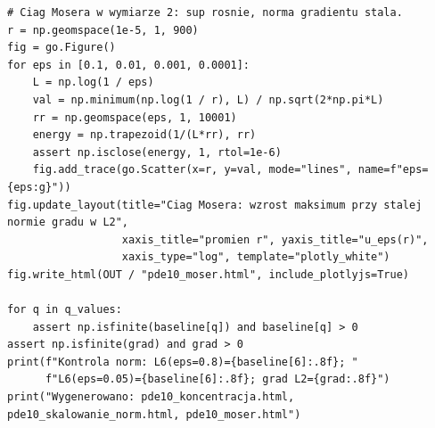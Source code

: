 \begin{lstlisting}[style=pythonpde,caption={Koncentracja i ostrosc zanurzen Sobolewa - Plotly},label={code:pde-embed10}]
# Ciag Mosera w wymiarze 2: sup rosnie, norma gradientu stala.
r = np.geomspace(1e-5, 1, 900)
fig = go.Figure()
for eps in [0.1, 0.01, 0.001, 0.0001]:
    L = np.log(1 / eps)
    val = np.minimum(np.log(1 / r), L) / np.sqrt(2*np.pi*L)
    rr = np.geomspace(eps, 1, 10001)
    energy = np.trapezoid(1/(L*rr), rr)
    assert np.isclose(energy, 1, rtol=1e-6)
    fig.add_trace(go.Scatter(x=r, y=val, mode="lines", name=f"eps={eps:g}"))
fig.update_layout(title="Ciag Mosera: wzrost maksimum przy stalej normie gradu w L2",
                  xaxis_title="promien r", yaxis_title="u_eps(r)",
                  xaxis_type="log", template="plotly_white")
fig.write_html(OUT / "pde10_moser.html", include_plotlyjs=True)

for q in q_values:
    assert np.isfinite(baseline[q]) and baseline[q] > 0
assert np.isfinite(grad) and grad > 0
print(f"Kontrola norm: L6(eps=0.8)={baseline[6]:.8f}; "
      f"L6(eps=0.05)={baseline[6]:.8f}; grad L2={grad:.8f}")
print("Wygenerowano: pde10_koncentracja.html, pde10_skalowanie_norm.html, pde10_moser.html")
\end{lstlisting}


